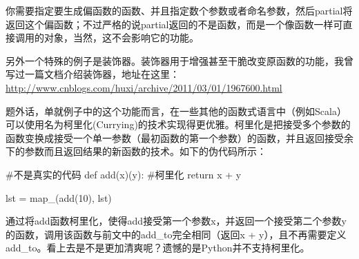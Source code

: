 \documentclass[12pt,a4paper]{report}
\begin{document}
你需要指定要生成偏函数的函数、并且指定数个参数或者命名参数，然后partial将返回这个偏函数；不过严格的说partial返回的不是函数，而是一个像函数一样可直接调用的对象，当然，这不会影响它的功能。

另外一个特殊的例子是装饰器。装饰器用于增强甚至干脆改变原函数的功能，我曾写过一篇文档介绍装饰器，地址在这里：\url{http://www.cnblogs.com/huxi/archive/2011/03/01/1967600.html}

题外话，单就例子中的这个功能而言，在一些其他的函数式语言中（例如Scala）可以使用名为柯里化(Currying)的技术实现得更优雅。柯里化是把接受多个参数的函数变换成接受一个单一参数（最初函数的第一个参数）的函数，并且返回接受余下的参数而且返回结果的新函数的技术。如下的伪代码所示：
\begin{python}[moreemph={[4]42},caption={},label=ex1]
#不是真实的代码
def add(x)(y): #柯里化
    return x + y 
    
lst = map_(add(10), lst)
\end{python}

通过将add函数柯里化，使得add接受第一个参数x，并返回一个接受第二个参数y的函数，调用该函数与前文中的add\_to完全相同（返回x + y），且不再需要定义add\_to。看上去是不是更加清爽呢？遗憾的是Python并不支持柯里化。
\end{document}
